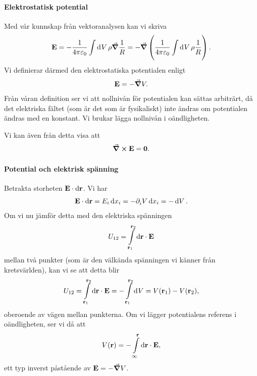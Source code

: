 \paragraph{Elektrostatisk potential}
Med vår kunnskap från vektoranalysen kan vi skriva
\begin{align*}
	\vb{E} = -\frac{1}{4\pi\varepsilon_{0}}\int\limits_{}^{}\dd[]{V}\rho\grad{\frac{1}{R}} = -\grad{\left(\frac{1}{4\pi\varepsilon_{0}}\int\limits_{}^{}\dd[]{V}\rho\frac{1}{R}\right)}.
\end{align*}
Vi definierar därmed den elektrostatiska potentialen enligt
\begin{align*}
	\vb{E} = -\grad{V}.
\end{align*}
Från våran definition ser vi att nollnivån för potentialen kan sättas arbiträrt, då det elektriska fältet (som är det som är fysikaliskt) inte ändras om potentialen ändras med en konstant. Vi brukar lägga nollnivån i oändligheten.

Vi kan även från detta visa att
\begin{align*}
	\curl{\vb{E}} = \vb{0}.
\end{align*}

\paragraph{Potential och elektrisk spänning}
Betrakta storheten $\vb{E}\cdot\dd{\vb{r}}$. Vi har
\begin{align*}
	\vb{E}\cdot\dd{\vb{r}} = E_{i}\dd{x_{i}} = -\partial_{i}^{}V\dd{x_{i}} = -\dd{V}.
\end{align*}
Om vi nu jämför detta med den elektriska spänningen
\begin{align*}
	U_{12} = \int\limits_{\vb{r}_{1}}^{\vb{r}_{2}}\dd{\vb{\vb{r}}}\cdot \vb{E}
\end{align*}
mellan två punkter (som är den välkända spänningen vi känner från kretsvärlden), kan vi se att detta blir
\begin{align*}
	U_{12} = \int\limits_{\vb{r}_{1}}^{\vb{r}_{2}}\dd{\vb{\vb{r}}}\cdot \vb{E} = -\int\limits_{\vb{r}_{1}}^{\vb{r}_{2}}\dd[]{V} = V(\vb{r}_{1}) - V(\vb{r}_{2}),
\end{align*}
oberoende av vägen mellan punkterna. Om vi lägger potentialens referens i oändligheten, ser vi då att
\begin{align*}
	V(\vb{r}) = -\int\limits_{\infty}^{\vb{r}}\dd{\vb{\vb{r}}}\cdot \vb{E},
\end{align*}
ett typ inverst påstående av $\vb{E} = -\grad{V}$.